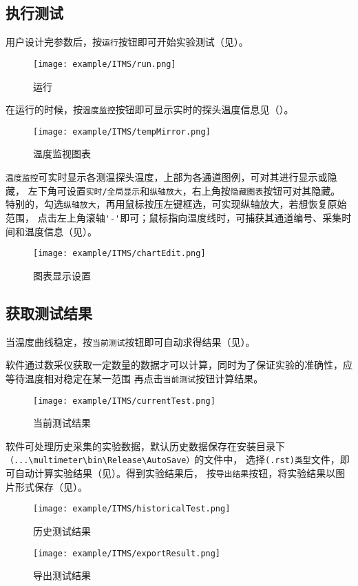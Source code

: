 \subsection{执行测试}
用户设计完参数后，按\lstinline{运行}按钮即可开始实验测试（见）。
\begin{figure}[htbp]
	\centering
	\texttt{[image: example/ITMS/run.png]}
	\caption{ 运行 \label{fig:exmp_itms_run}}
\end{figure}
在运行的时候，按\lstinline{温度监控}按钮即可显示实时的探头温度信息见（）。
\begin{figure}[htbp]
	\centering
	\texttt{[image: example/ITMS/tempMirror.png]}
	\caption{ 温度监视图表 \label{fig:exmp_itms_tempMirror}}
\end{figure}
\lstinline{温度监控}可实时显示各测温探头温度，上部为各通道图例，可对其进行显示或隐藏，
左下角可设置\lstinline{实时/全局显示}和\lstinline{纵轴放大}，右上角按\lstinline{隐藏图表}按钮可对其隐藏。
特别的，勾选\lstinline{纵轴放大}，再用鼠标按压左键框选，可实现纵轴放大，若想恢复原始范围，
点击左上角滚轴\lstinline{'-'}即可；鼠标指向温度线时，可捕获其通道编号、采集时间和温度信息（见）。\\
\begin{figure}[htbp]
	\centering
	\texttt{[image: example/ITMS/chartEdit.png]}
	\caption{ 图表显示设置 \label{fig:exmp_itms_chartEdit}}
\end{figure}

\subsection{获取测试结果}
	当温度曲线稳定，按\lstinline{当前测试}按钮即可自动求得结果（见）。
\begin{note}
	软件通过数采仪获取一定数量的数据才可以计算，同时为了保证实验的准确性，应等待温度相对稳定在某一范围
再点击\lstinline{当前测试}按钮计算结果。
\end{note}
\begin{figure}[htbp]
	\centering
	\texttt{[image: example/ITMS/currentTest.png]}
	\caption{ 当前测试结果 \label{fig:exmp_itms_currentTest}}
\end{figure}
软件可处理历史采集的实验数据，默认历史数据保存在安装目录下\lstinline{（...\multimeter\bin\Release\AutoSave）}的文件中，
选择\lstinline{(.rst)类型}文件，即可自动计算实验结果（见）。得到实验结果后，
按\lstinline{导出结果}按钮，将实验结果以图片形式保存（见）。
\begin{figure}[htbp]
	\centering
	\texttt{[image: example/ITMS/historicalTest.png]}
	\caption{ 历史测试结果 \label{fig:exmp_itms_historicalTest}}
\end{figure}

\begin{figure}[htbp]
	\centering
	\texttt{[image: example/ITMS/exportResult.png]}
	\caption{ 导出测试结果 \label{fig:exmp_itms_exportResult}}
\end{figure}